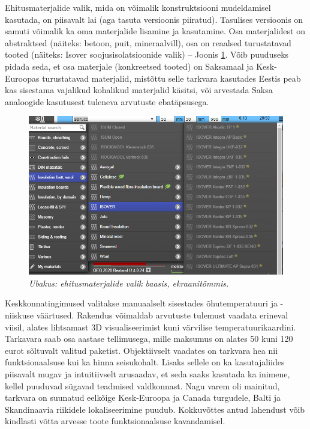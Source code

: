 Ehitusmaterjalide valik, mida on võimalik konstruktsiooni mudeldamisel kasutada, on piisavalt lai 
(aga tasuta versioonis piiratud). Tasulises versioonis on samuti võimalik ka oma materjalide 
lisamine ja kasutamine. Osa materjalidest on abstraktsed (näiteks: betoon, puit, mineraalvill), osa
on reaalsed turustatavad tooted (näiteks: Isover soojusisolatsioonide valik) -- Joonis \ref{fig:ubakus_materials}. Võib puuduseks pidada
seda, et osa materjale (konkreetsed tooted) on Saksamaal ja Kesk-Euroopas turustatavad materjalid, mistõttu selle 
tarkvara kasutades Eestis peab kas sisestama vajalikud kohalikud materjalid käsitsi, või arvestada Saksa analoogide
kasutusest tuleneva arvutuste ebatäpsusega.
\begin{figure}[ht]
    \centering
    \includegraphics[width=1\textwidth]{figures/problem_statement/03_ubakus_materials.png}
    \caption[Ubakus tarkvara materjalide valik, ekraanitõmmis]{\textit{Ubakus: ehitusmaterjalide valik baasis, ekraanitõmmis.}}
    \label{fig:ubakus_materials}
\end{figure}

Keskkonnatingimused valitakse manuaalselt sisestades õhutemperatuuri ja -niiskuse väärtused. Rakendus võimaldab arvutuste tulemust
vaadata erineval viisil, alates lihtsamast 3D visualiseerimist kuni värvilise temperatuurikaardini. Tarkavara saab osa aastase 
tellimusega, mille maksumus on alates 50 kuni 120 eurot sõltuvalt valitud paketist. Objektiivselt vaadates on tarkvara hea nii
funktsionaalsuse kui ka hinna seisukohalt. Lisaks sellele on ka kasutajaliides piisavalt mugav ja intuitiivselt arusaadav,
et seda saaks kasutada ka inimene, kellel puuduvad sügavad teadmised valdkonnast. Nagu varem oli mainitud, 
tarkvara on suunatud eelkõige Kesk-Euroopa ja Canada turgudele, Balti ja Skandinaavia riikidele lokaliseerimine puudub. Kokkuvõttes
antud lahendust võib kindlasti võtta arvesse toote funktsionaalsuse kavandamisel.

